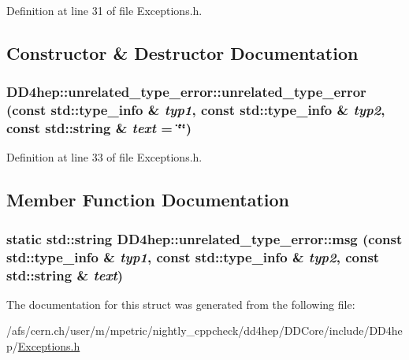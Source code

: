 Definition at line 31 of file Exceptions.h.

\subsection{Constructor \& Destructor Documentation}
\hypertarget{struct_d_d4hep_1_1unrelated__type__error_a53f8227fa75c1552d30b3d43e104a2ba}{
\subsubsection[{unrelated\_\-type\_\-error}]{\setlength{\rightskip}{0pt plus 5cm}DD4hep::unrelated\_\-type\_\-error::unrelated\_\-type\_\-error (const std::type\_\-info \& {\em typ1}, \/  const std::type\_\-info \& {\em typ2}, \/  const std::string \& {\em text} = {\ttfamily \char`\"{}\char`\"{}})}}
\label{struct_d_d4hep_1_1unrelated__type__error_a53f8227fa75c1552d30b3d43e104a2ba}


Definition at line 33 of file Exceptions.h.

\subsection{Member Function Documentation}
\hypertarget{struct_d_d4hep_1_1unrelated__type__error_a5d9a561a8473ee52610cd10777878862}{
\subsubsection[{msg}]{\setlength{\rightskip}{0pt plus 5cm}static std::string DD4hep::unrelated\_\-type\_\-error::msg (const std::type\_\-info \& {\em typ1}, \/  const std::type\_\-info \& {\em typ2}, \/  const std::string \& {\em text})}}
\label{struct_d_d4hep_1_1unrelated__type__error_a5d9a561a8473ee52610cd10777878862}


The documentation for this struct was generated from the following file:\begin{DoxyCompactItemize}
\item 
/afs/cern.ch/user/m/mpetric/nightly\_\-cppcheck/dd4hep/DDCore/include/DD4hep/\hyperlink{_d_d_core_2include_2_d_d4hep_2_exceptions_8h}{Exceptions.h}\end{DoxyCompactItemize}
